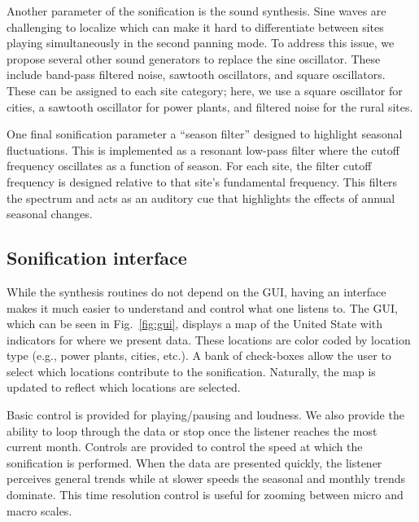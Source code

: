 \documentclass[a4paper,10pt,oneside]{article}
\newcommand{\ce}[1]{$\mathrm{#1}$}
\begin{document}
\begin{sloppy}
Another parameter of the sonification is the sound synthesis. Sine waves are challenging to localize which can make it hard to differentiate between sites playing simultaneously in the second panning mode. To address this issue, we propose several other sound generators to replace the sine oscillator. These include band-pass filtered noise, sawtooth oscillators, and square oscillators. These can be assigned to each site category; here, we use a square oscillator for cities, a sawtooth oscillator for power plants, and filtered noise for the rural sites. 

One final sonification parameter a ``season filter'' designed to highlight seasonal fluctuations. This is implemented as a resonant low-pass filter where the cutoff frequency oscillates as a function of season. For each site, the filter cutoff frequency is designed relative to that site's fundamental frequency.  This filters the spectrum and acts as an auditory cue that highlights the effects of annual seasonal changes. 






\subsection{Sonification interface}

While the synthesis routines do not depend on the GUI, having an interface makes it much easier to understand and control what one listens to. The GUI, which can be seen in Fig.~\ref{fig:gui}, displays a map of the United State with indicators for where we present data.  These locations are color coded by location type (e.g., power plants, cities, etc.). A bank of check-boxes allow the user to select which locations contribute to the sonification. Naturally, the map is updated to reflect which locations are selected.  


Basic control is provided for playing/pausing and loudness. We also provide the ability to loop through the data or stop once the listener reaches the most current month.  Controls are provided to control the speed at which the sonification is performed.  When the data are presented quickly, the listener perceives general trends while at slower speeds the seasonal and monthly trends dominate.  This time resolution control is useful for zooming between micro and macro scales.  


\end{sloppy}
\end{document}
